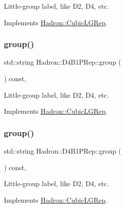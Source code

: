 Little-\/group label, like D2, D4, etc. 

Implements \mbox{\hyperlink{structHadron_1_1CubicLGRep_a9bdb14b519a611d21379ed96a3a9eb41}{Hadron\+::\+Cubic\+L\+G\+Rep}}.

\mbox{\label{structHadron_1_1D4B1PRep_a2826854e4c6a3edb94112b11b577702b}} 
\subsubsection{\texorpdfstring{group()}{group()}\hspace{0.1cm}{\footnotesize\ttfamily [2/3]}}
{\footnotesize\ttfamily std\+::string Hadron\+::\+D4\+B1\+P\+Rep\+::group (\begin{DoxyParamCaption}{ }\end{DoxyParamCaption}) const\hspace{0.3cm}{\ttfamily [inline]}, {\ttfamily [virtual]}}

Little-\/group label, like D2, D4, etc. 

Implements \mbox{\hyperlink{structHadron_1_1CubicLGRep_a9bdb14b519a611d21379ed96a3a9eb41}{Hadron\+::\+Cubic\+L\+G\+Rep}}.

\mbox{\label{structHadron_1_1D4B1PRep_a2826854e4c6a3edb94112b11b577702b}} 
\subsubsection{\texorpdfstring{group()}{group()}\hspace{0.1cm}{\footnotesize\ttfamily [3/3]}}
{\footnotesize\ttfamily std\+::string Hadron\+::\+D4\+B1\+P\+Rep\+::group (\begin{DoxyParamCaption}{ }\end{DoxyParamCaption}) const\hspace{0.3cm}{\ttfamily [inline]}, {\ttfamily [virtual]}}

Little-\/group label, like D2, D4, etc. 

Implements \mbox{\hyperlink{structHadron_1_1CubicLGRep_a9bdb14b519a611d21379ed96a3a9eb41}{Hadron\+::\+Cubic\+L\+G\+Rep}}.

\mbox{\label{structHadron_1_1D4B1PRep_af8dc23f058e45e4ee038bf8e7f2eb5b2}} 
